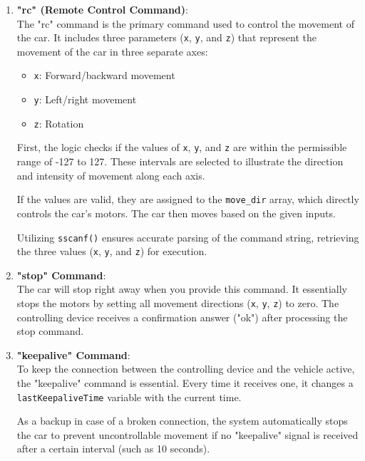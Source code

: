 \documentclass[a4paper,12pt]{article}
\begin{document}
\begin{enumerate}
    \item \textbf{"rc" (Remote Control Command)}:\\
    The "rc" command is the primary command used to control the movement of the car. It includes three parameters (\texttt{x}, \texttt{y}, and \texttt{z}) that represent the movement of the car in three separate axes:
    \begin{itemize}
        \item \texttt{x}: Forward/backward movement
        \item \texttt{y}: Left/right movement
        \item \texttt{z}: Rotation
    \end{itemize}

    First, the logic checks if the values of \texttt{x}, \texttt{y}, and \texttt{z} are within the permissible range of -127 to 127. These intervals are selected to illustrate the direction and intensity of movement along each axis.
    
    If the values are valid, they are assigned to the \texttt{move\_dir} array, which directly controls the car's motors. The car then moves based on the given inputs. 
    
    Utilizing \texttt{sscanf()} ensures accurate parsing of the command string, retrieving the three values (\texttt{x}, \texttt{y}, and \texttt{z}) for execution.

    \item \textbf{"stop" Command}:\\
    The car will stop right away when you provide this command. It essentially stops the motors by setting all movement directions (\texttt{x}, \texttt{y}, \texttt{z}) to zero. The controlling device receives a confirmation answer ("ok") after processing the stop command.

    \item \textbf{"keepalive" Command}:\\
    To keep the connection between the controlling device and the vehicle active, the "keepalive" command is essential. Every time it receives one, it changes a \texttt{lastKeepaliveTime}  variable with the current time.
    
    As a backup in case of a broken connection, the system automatically stops the car to prevent uncontrollable movement if no "keepalive" signal is received after a certain interval (such as 10 seconds).


\end{enumerate}
\end{document}
